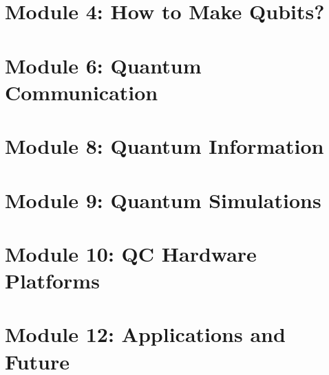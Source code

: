 
\section[HW]{Module 4: How to Make Qubits?}


\section[Comm]{Module 6: Quantum Communication}


\section[Info]{Module 8: Quantum Information}


\section[Sim]{Module 9: Quantum Simulations}


\section[Platforms]{Module 10: QC Hardware Platforms}


\section[Apps]{Module 12: Applications and Future}


% 
% 
